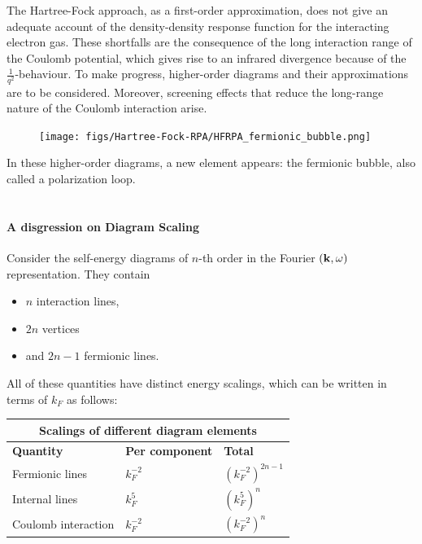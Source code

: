 \documentclass{homework}
\begin{document}
The Hartree-Fock approach, as a first-order approximation, does not give an adequate account of the density-density response function for the interacting electron gas. These shortfalls are the consequence of the long interaction range of the Coulomb potential, which gives rise  to an infrared divergence because of the $\frac{1}{q^2}$-behaviour. To make progress, higher-order diagrams and their approximations are to be considered. Moreover, screening effects that reduce the long-range nature of the Coulomb interaction arise. 

\begin{figure}
\texttt{[image: figs/Hartree-Fock-RPA/HFRPA\_fermionic\_bubble.png]}
\end{figure} 

In these higher-order diagrams, a new element appears: the fermionic bubble, also called a polarization loop.  \\

\blanky \\

\paragraph{A disgression on Diagram Scaling}

Consider the self-energy diagrams of $n$-th order in the Fourier $({\bf k}, \omega)$ representation. They contain

\begin{itemize}
    \item $n$ interaction lines,
    \item $2n$ vertices 
    \item and $2n-1$ fermionic lines. 
\end{itemize}

All of these quantities have distinct energy scalings, which can be written in terms of $k_F$ as follows:

\begin{table}[!h]
\centering
\begin{tabular}{ |p{5cm}||p{5cm}|p{4cm}|  }
 \hline
 \multicolumn{3}{|c|}{Scalings of different diagram elements} \\
 \hline
 \textbf{Quantity} & \textbf{Per component} & \textbf{ Total} \\
 \hline
 Fermionic lines & $k_F^{-2}$ & $(k_F^{-2})^{2n-1}$\\
 Internal lines & $k_F^5$ & $(k_F^5)^n$ \\
 Coulomb interaction & $k_F^{-2}$ & $(k_F^{-2})^n$\\
 \hline
\end{tabular}
 \label{diagram_elements_scalings}
\end{table}
\end{document}
